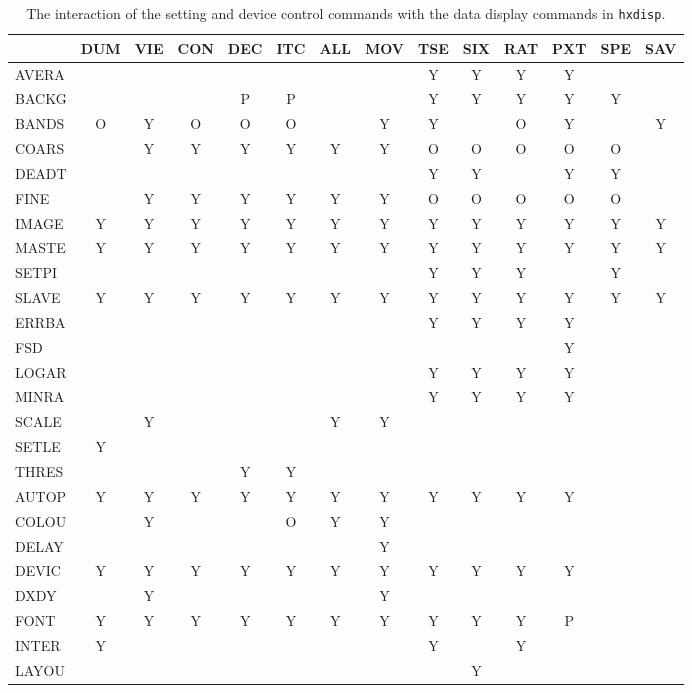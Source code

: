 \begin{table}
\caption{\label{interact} The interaction of the setting and device control
commands with the data display commands in {\tt hxdisp}.} {\small
\begin{center}
\begin{tabular}{|l|*{7}{c}|*{4}{c}|*{2}{c}|} \hline
& DUM & VIE & CON & DEC & ITC & ALL & MOV & TSE & SIX & RAT & PXT & SPE
& SAV \\
\hline
AVERA & & & & & & & & Y & Y & Y & Y & & \\
BACKG & & & & P & P & & & Y & Y & Y & Y & Y & \\
BANDS & O & Y & O & O & O & & Y & Y & & O & Y & & Y \\
COARS & & Y & Y & Y & Y & Y & Y & O & O & O & O & O & \\
DEADT & & & & & & & & Y & Y & & Y & Y & \\
FINE & & Y & Y & Y & Y & Y & Y & O & O & O & O & O & \\
IMAGE & Y & Y & Y & Y & Y & Y & Y & Y & Y & Y & Y & Y & Y \\
MASTE & Y & Y & Y & Y & Y & Y & Y & Y & Y & Y & Y & Y & Y \\
SETPI & & & & & & & & Y & Y & Y & & Y & \\
SLAVE & Y & Y & Y & Y & Y & Y & Y & Y & Y & Y & Y & Y & Y \\
\hline
ERRBA & & & & & & & & Y & Y & Y & Y & & \\
FSD & & & & & & & & & & & Y & & \\
LOGAR & & & & & & & & Y & Y & Y & Y & & \\
MINRA & & & & & & & & Y & Y & Y & Y & & \\
SCALE & & Y & & & & Y & Y & & & & & & \\
SETLE & Y & & & & & & & & & & & & \\
THRES & & & & Y & Y & & & & & & & & \\
\hline
AUTOP & Y & Y & Y & Y & Y & Y & Y & Y & Y & Y & Y & & \\
COLOU & & Y & & & O & Y & Y & & & & & & \\
DELAY & & & & & & & Y & & & & & & \\
DEVIC & Y & Y & Y & Y & Y & Y & Y & Y & Y & Y & Y & & \\
DXDY & & Y & & & & & Y & & & & & & \\
FONT & Y & Y & Y & Y & Y & Y & Y & Y & Y & Y & P & & \\
INTER & Y & & & & & & & Y & & Y & & & \\
LAYOU & & & & & & & & & Y & & & & \\

\end{tabular}
\end{center}}
\end{table}
